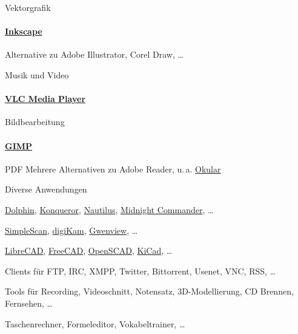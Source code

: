 \documentclass{beamer}
\begin{document}
\begin{frame}{Vektorgrafik}
    \framesubtitle{\href{https://inkscape.org/}{Inkscape}}
    Alternative zu Adobe Illustrator, Corel Draw, …
\end{frame}

\begin{frame}{Musik und Video}
    \framesubtitle{\href{https://www.videolan.org/vlc/}{VLC Media Player}}
\end{frame}

\begin{frame}{Bildbearbeitung}
    \framesubtitle{\href{https://www.gimp.org/}{GIMP}}
\end{frame}

\begin{frame}{PDF}
    Mehrere Alternativen zu Adobe Reader, u.\,a.
    \href{https://okular.kde.org/}{Okular}
\end{frame}

\begin{frame}{Diverse Anwendungen}
    \begin{description}[Lernprogramme]
        \item[Dateimanager]
            \href{https://userbase.kde.org/Dolphin}{Dolphin},
            \href{https://konqueror.org/}{Konqueror},
            \href{https://wiki.gnome.org/Apps/Files}{Nautilus},
            \href{https://midnight-commander.org/}{Midnight Commander},
            …
        \item[Bilder]
            \href{https://gitlab.gnome.org/GNOME/simple-scan}{SimpleScan},
            \href{https://www.digikam.org/}{digiKam},
            \href{https://userbase.kde.org/Gwenview}{Gwenview}, …
        \item[CAD] \href{https://librecad.org/}{LibreCAD},
            \href{https://www.freecadweb.org/}{FreeCAD},
            \href{http://www.openscad.org/}{OpenSCAD},
            \href{http://kicad-pcb.org/}{KiCad}, …
        \item[Internet] Clients für FTP, IRC, XMPP, Twitter, Bittorrent,
            Usenet, VNC, RSS, …
        \item[Multimedia] Tools für Recording, Videoschnitt, Notensatz,
            3D-Modellierung, CD Brennen, Fernsehen, …
        \item[Lernprogramme] Taschenrechner, Formeleditor,
            Vokabeltrainer, …
    \end{description}
\end{frame}
\end{document}
